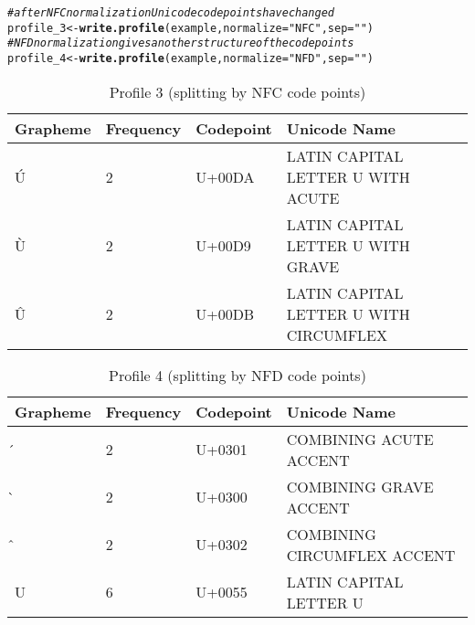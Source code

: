 \documentclass[output=inprep,
		biblatex
		]{LSP/langsci}\usepackage[]{graphicx}\usepackage[]{color}
\makeatletter
\newcommand{\hlstr}[1]{\textcolor[rgb]{0.192,0.494,0.8}{#1}}%
\newcommand{\hlcom}[1]{\textcolor[rgb]{0.678,0.584,0.686}{\textit{#1}}}%
\newcommand{\hlstd}[1]{\textcolor[rgb]{0.345,0.345,0.345}{#1}}%
\newcommand{\hlkwb}[1]{\textcolor[rgb]{0.69,0.353,0.396}{#1}}%
\newcommand{\hlkwc}[1]{\textcolor[rgb]{0.333,0.667,0.333}{#1}}%
\newcommand{\hlkwd}[1]{\textcolor[rgb]{0.737,0.353,0.396}{\textbf{#1}}}%
\newenvironment{kframe}{%
 \def\at@end@of@kframe{}%
 \ifinner\ifhmode%
  \def\at@end@of@kframe{\end{minipage}}%
  \begin{minipage}{\columnwidth}%
 \fi\fi%
 \def\FrameCommand##1{\hskip\@totalleftmargin \hskip-\fboxsep
 \colorbox{shadecolor}{##1}\hskip-\fboxsep
     \hskip-\linewidth \hskip-\@totalleftmargin \hskip\columnwidth}%
 \MakeFramed {\advance\hsize-\width
   \@totalleftmargin\z@ \linewidth\hsize
   \@setminipage}}%
 {\par\unskip\endMakeFramed%
 \at@end@of@kframe}
\newenvironment{knitrout}{}{} %
\makeatother
\begin{document}
\begin{knitrout}\footnotesize
{}\color{fgcolor}\begin{kframe}
\begin{alltt}
\hlcom{# after NFC normalization Unicode code points have changed}
\hlstd{profile_3} \hlkwb{<-} \hlkwd{write.profile}\hlstd{(example,} \hlkwc{normalize} \hlstd{=} \hlstr{"NFC"}\hlstd{,} \hlkwc{sep} \hlstd{=} \hlstr{""}\hlstd{)}
\hlcom{# NFD normalization gives another structure of the code points}
\hlstd{profile_4} \hlkwb{<-} \hlkwd{write.profile}\hlstd{(example,} \hlkwc{normalize} \hlstd{=} \hlstr{"NFD"}\hlstd{,} \hlkwc{sep} \hlstd{=} \hlstr{""}\hlstd{)}
\end{alltt}
\end{kframe}
\end{knitrout}

\begin{table}[H]
\centering
\begingroup\scriptsize
\begin{tabular}{llll}
  \toprule
Grapheme & Frequency & Codepoint & Unicode Name \\ 
  \midrule
Ú & 2 & U+00DA & LATIN CAPITAL LETTER U WITH ACUTE \\ 
  Ù & 2 & U+00D9 & LATIN CAPITAL LETTER U WITH GRAVE \\ 
  Û & 2 & U+00DB & LATIN CAPITAL LETTER U WITH CIRCUMFLEX \\ 
   \bottomrule
\end{tabular}
\endgroup
\caption{Profile 3 (splitting by NFC code points)} 
\label{tab:profile3}
\end{table}


\begin{table}[H]
\centering
\begingroup\scriptsize
\begin{tabular}{llll}
  \toprule
Grapheme & Frequency & Codepoint & Unicode Name \\ 
  \midrule
́ & 2 & U+0301 & COMBINING ACUTE ACCENT \\ 
  ̀ & 2 & U+0300 & COMBINING GRAVE ACCENT \\ 
  ̂ & 2 & U+0302 & COMBINING CIRCUMFLEX ACCENT \\ 
  U & 6 & U+0055 & LATIN CAPITAL LETTER U \\ 
   \bottomrule
\end{tabular}
\endgroup
\caption{Profile 4 (splitting by NFD code points)} 
\label{tab:profile4}
\end{table}
\end{document}
